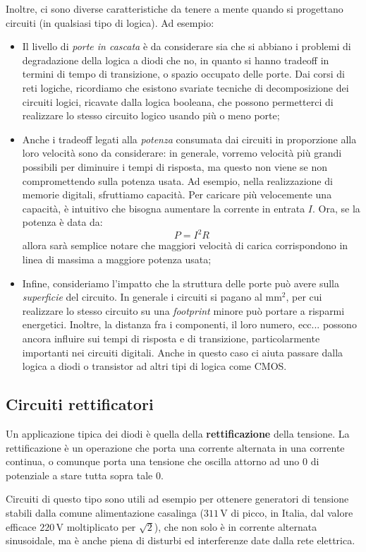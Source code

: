 \documentclass[a4paper,11pt]{article}
\begin{document}
Inoltre, ci sono diverse caratteristiche da tenere a mente quando si progettano circuiti (in qualsiasi tipo di logica). Ad esempio:
\begin{itemize}
	\item Il livello di \textit{porte in cascata} è da considerare sia che si abbiano i problemi di degradazione della logica a diodi che no, in quanto si hanno tradeoff in termini di tempo di transizione, o spazio occupato delle porte. Dai corsi di reti logiche, ricordiamo che esistono svariate tecniche di decomposizione dei circuiti logici, ricavate dalla logica booleana, che possono permetterci di realizzare lo stesso circuito logico usando più o meno porte;
	\item Anche i tradeoff legati alla \textit{potenza} consumata dai circuiti in proporzione alla loro velocità sono da considerare: in generale, vorremo velocità più grandi possibili per diminuire i tempi di risposta, ma questo non viene se non compromettendo sulla potenza usata. Ad esempio, nella realizzazione di memorie digitali, sfruttiamo capacità. Per caricare più velocemente una capacità, è intuitivo che bisogna aumentare la corrente in entrata $I$. Ora, se la potenza è data da:
		$$
		P = I^2 R
		$$
allora sarà semplice notare che maggiori velocità di carica corrispondono in linea di massima a maggiore potenza usata;
\item Infine, consideriamo l'impatto che la struttura delle porte può avere sulla \textit{superficie} del circuito. In generale i circuiti si pagano al $\mathrm{mm}^2$, per cui realizzare lo stesso circuito su una \textit{footprint} minore può portare a risparmi energetici. Inoltre, la distanza fra i componenti, il loro numero, ecc... possono ancora influire sui tempi di risposta e di transizione, particolarmente importanti nei circuiti digitali. Anche in questo caso ci aiuta passare dalla logica a diodi o transistor ad altri tipi di logica come CMOS.
\end{itemize}

\subsection{Circuiti rettificatori}
Un applicazione tipica dei diodi è quella della \textbf{rettificazione} della tensione. La rettificazione è un operazione che porta una corrente alternata in una corrente continua, o comunque porta una tensione che oscilla attorno ad uno $0$ di potenziale a stare tutta sopra tale 0.

Circuiti di questo tipo sono utili ad esempio per ottenere generatori di tensione stabili dalla comune alimentazione casalinga ($311 \, \mathrm{V}$ di picco, in Italia, dal valore efficace $220 \, \mathrm{V}$ moltiplicato per $\sqrt{2}$), che non solo è in corrente alternata sinusoidale, ma è anche piena di disturbi ed interferenze date dalla rete elettrica.
\end{document}
